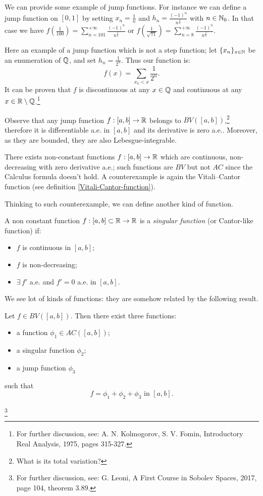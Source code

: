 We can provide some example of jump functions. For instance we can define a jump function on $[0,1]$ by setting $x_n=\frac 1 n$ and $h_n = \frac{(-1)^n}{n^{\frac 3 2}}$ with $n \in \mathbb N_0$.
In that case we have $f(\frac{1}{100}) = \sum_{n=101}^{+\infty} \frac{(-1)^n}{n^{\frac 3 2}}$ or $f(\frac{1}{\sqrt{71}}) = \sum_{n=8}^{+\infty} \frac{(-1)^n}{n^{\frac 3 2}}$.

Here an example of a jump function which is not a step function; let $\{x_n\}_{x \in \mathbb N}$ be an enumeration of $\mathbb Q$, and set $h_n = \frac 1 {2^n}$. Thus our function is:
	$$f(x)=\sum_{x_n < x} \frac 1 {2^n}.$$
It can be proven that $f$ is discontinuous at any $x \in \mathbb Q$ and continuous at any $x \in \mathbb R \setminus \mathbb Q$.\footnote{For further discussion, see: A. N. Kolmogorov, S. V. Fomin, Introductory Real Analysis, 1975, pages 315-327.}


Observe that any jump function $f:[a,b] \to \mathbb R$ belongs to $BV([a,b])$,\footnote{What is its total variation?} therefore it is differentiable a.e. in $[a,b]$ and its derivative is zero a.e.. Moreover, as they are bounded, they are also Lebesgue-integrable. 

There exists non-constant functions $f:[a,b] \to \mathbb R$ which are continuous, non-decreasing with zero derivative a.e.; such functions are $BV$ but not $AC$ since the Calculus formula doesn't hold. A counterexample is again the Vitali--Cantor function (see definition \vref{Vitali-Cantor-function}).

Thinking to such counterexample, we can define another kind of function.
\begin{defn}
	A non constant function $f:[a,b] \subset \mathbb R \to \mathbb R$ is a \emph{singular function} (or Cantor-like function) if:
	\begin{itemize}
		\item $f$ is continuous in $[a,b]$;
		\item $f$ is non-decreasing;
		\item $\exists \, f'$ a.e. and $f'=0$ a.e. in $[a,b]$.
	\end{itemize}
\end{defn}

We see lot of kinds of functions: they are somehow related by the following result.
\begin{theo}
	Let $f\in BV([a,b])$. Then there exist three functions:
	\begin{itemize}
		\item a function $\phi_1 \in AC([a,b])$;
		\item a singular function $\phi_2$;
		\item a jump function $\phi_3$
	\end{itemize}
	such that $$f= \phi_1+\phi_2+\phi_3 \text{ in }[a,b].$$
\end{theo}\footnote{For further discussion, see: G. Leoni, A First Course in Sobolev Spaces, 2017, page 104, theorem 3.89.}

